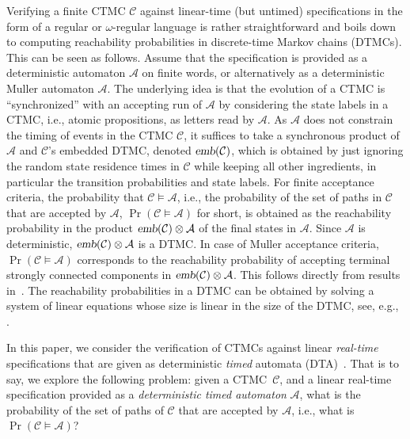 \documentclass{LMCS}
\newcommand{\mc}[1]{\mathcal{#1}}
\newcommand{\<}{\langle}
\renewcommand{\>}{\rangle}
\newcommand{\mC}{\mathcal{C}}
\newcommand{\mA}{\mathcal{A}}
\newcommand{\CTMC}{\textsc{{CTMC}}}
\newcommand{\emb}{\textsl{emb}}
\begin{document}
Verifying a finite CTMC $\mc{C}$ against linear-time (but untimed) specifications
in the form of a regular or $\omega$-regular language is rather straightforward
and boils down to computing reachability probabilities in discrete-time Markov
chains (DTMCs).
This can be seen as follows.
Assume that the specification is provided as a deterministic automaton $\mc{A}$
on finite words, or alternatively as a deterministic Muller automaton $\mc{A}$.
The underlying idea is that the evolution of a CTMC is ``synchronized'' with an
accepting run of $\mc{A}$ by considering the state labels in a CTMC, i.e., atomic
propositions, as letters read by $\mc{A}$.
As $\mc{A}$ does not constrain the timing of events in the CTMC $\mc{C}$, it
suffices to take a synchronous product of $\mc{A}$ and $\mc{C}$'s embedded
DTMC, denoted $\emb(\mc{C})$, which is obtained by just ignoring the random
state residence times in $\mc{C}$ while keeping all other ingredients, in particular
the transition probabilities and state labels.
For finite acceptance criteria, the probability that $\mc{C} \models \mc{A}$, i.e., the
probability of the set of paths in $\mc{C}$ that are accepted by $\mc{A}$,
$\Pr(\mc{C} \models \mc{A})$ for short, is obtained as the reachability probability in
the product $\emb(\mc{C}) \otimes \mc{A}$ of the final states in $\mc{A}$.
Since $\mA$ is deterministic, $\emb(\mC)\otimes\mA$ is a DTMC.
In case of Muller acceptance criteria, $\Pr(\mc{C} \models \mc{A})$ corresponds
to the reachability probability of accepting terminal strongly connected components
in $\emb(\mc{C}) \otimes \mc{A}$.  This follows directly from results in~\cite{CY95}.
The reachability probabilities in a DTMC can be obtained by solving a system of linear
equations whose size is linear in the size of the DTMC, see, e.g., \cite{HJ94}.

In this paper, we consider the verification of CTMCs against linear \emph{real-time}
specifications that are given as deterministic \emph{timed} automata (DTA)~\cite{AD94}.
That is to say, we explore the following problem: given a \CTMC\ $\mc{C}$, and a
linear real-time specification provided as a \emph{deterministic timed automaton}
$\mc{A}$, what is the probability of the set of paths of $\mc{C}$ that are accepted
by $\mc{A}$, i.e., what is $\Pr(\mc{C} \models \mc{A})$?
\end{document}
